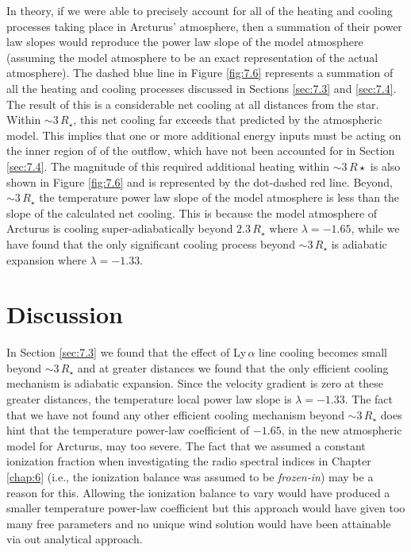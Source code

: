 In theory, if we were able to precisely account for all of the heating and cooling processes taking place in Arcturus' atmosphere, then a summation of their power law slopes would reproduce the power law slope of the model atmosphere (assuming the model atmosphere to be an exact representation of the actual atmosphere). The dashed blue line in Figure \ref{fig:7.6} represents a summation of all the heating and cooling processes discussed in Sections  \ref{sec:7.3} and \ref{sec:7.4}. The result of this is a considerable net cooling at all distances from the star. Within $\sim 3\,R_{\star}$, this net cooling far exceeds that predicted by the atmospheric model. This implies that one or more additional energy inputs must be acting on the inner region of of the outflow, which have not been accounted for in Section \ref{sec:7.4}. The magnitude of this required additional heating within $\sim 3\,R{\star}$ is also shown in Figure \ref{fig:7.6} and is represented by the dot-dashed red line. Beyond, $\sim 3\,R_{\star}$ the temperature power law slope of the model atmosphere is less than the slope of the calculated net cooling. This is because the model atmosphere of Arcturus is cooling super-adiabatically beyond $2.3\,R_{\star}$ where $\lambda = -1.65$, while we have found that the only significant cooling process beyond $\sim 3\,R_{\star}$ is adiabatic expansion where $\lambda = -1.33$. 

\section{Discussion}\label{sec:7.6}
In Section \ref{sec:7.3} we found that the effect of Ly\,$\alpha$ line cooling becomes small beyond $\sim 3\,R_{\star}$ and at greater distances we found that the only efficient cooling mechanism is adiabatic expansion. Since the velocity gradient is zero at these greater distances, the temperature local power law slope is $\lambda = -1.33$. The fact that we have not found any other efficient cooling mechanism beyond $\sim 3\,R_{\star}$ does hint that the temperature power-law coefficient of $-1.65$, in the new atmospheric model for Arcturus, may too severe. The fact that we assumed a constant ionization fraction when investigating the radio spectral indices in Chapter \ref{chap:6} (i.e., the ionization balance was assumed to be \textit{frozen-in}) may be a reason for this. Allowing the ionization balance to vary would have produced a smaller temperature power-law coefficient but this approach would have given too many free parameters and no unique wind solution would have been attainable via out analytical approach. 

